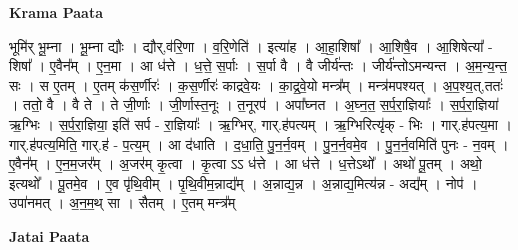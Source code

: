 \documentclass[17pt]{extarticle}
\begin{document}
\textbf{Krama Paata} \newline

भूमि॑र् भू॒म्ना । भू॒म्ना द्यौः । द्यौर्,व॑रि॒णा । व॒रि॒णेति॑ । इत्या॑ह । आ॒हा॒शिषा᳚ । आ॒शिषै॒व । आ॒शिषेत्या᳚ - शिषा᳚ । ए॒वैन᳚म् । ए॒न॒मा । आ ध॑त्ते । ध॒त्ते॒ स॒र्पाः । स॒र्पा वै । वै जीर्य॑न्तः । जीर्य॑न्तोऽमन्यन्त । अ॒म॒न्य॒न्त॒ सः । स ए॒तम् । ए॒तम् क॑स॒र्णीरः॑ । क॒स॒र्णीरः॑ काद्रवे॒यः । का॒द्र॒वे॒यो मन्त्र᳚म् । मन्त्र॑मपश्यत् । अ॒प॒श्य॒त्,ततः॑ । ततो॒ वै । वै ते । ते जी॒र्णाः । जी॒र्णास्त॒नूः । त॒नूरप॑ । अपा᳚घ्नत । अ॒घ्न॒त॒ स॒र्प॒रा॒ज्ञियाः᳚ । स॒र्प॒रा॒ज्ञिया॑ ऋ॒ग्भिः । स॒र्प॒रा॒ज्ञिया॒ इति॑ सर्प - रा॒ज्ञियाः᳚ । ऋ॒ग्भिर्, गार्.ह॑पत्यम् । ऋ॒ग्भिरित्यृ॑क् - भिः । गार्.ह॑पत्य॒मा । गार्.ह॑पत्य॒मिति॒ गार्.ह॑ - प॒त्य॒म् । आ द॑धाति । द॒धा॒ति॒ पु॒न॒र्न॒वम् । पु॒न॒र्न॒वमे॒व । पु॒न॒र्न॒वमिति॑ पुनः - न॒वम् । ए॒वैन᳚म् । ए॒न॒म॒जर᳚म् । अ॒जर॑म् कृ॒त्वा । कृ॒त्वा ऽऽ ध॑त्ते । आ ध॑त्ते । ध॒त्तेऽथो᳚ । अथो॑ पू॒तम् । अथो॒ इत्यथो᳚ । पू॒तमे॒व । ए॒व पृ॑थि॒वीम् । पृ॒थि॒वीम॒न्नाद्य᳚म् । अ॒न्नाद्य॒न्न । अ॒न्नाद्य॒मित्य॑न्न - अद्य᳚म् । नोप॑ । उपा॑नमत् । अ॒न॒म॒थ् सा । सैतम् । ए॒तम् मन्त्र᳚म् \newline

\textbf{Jatai Paata} \newline
\end{document}
